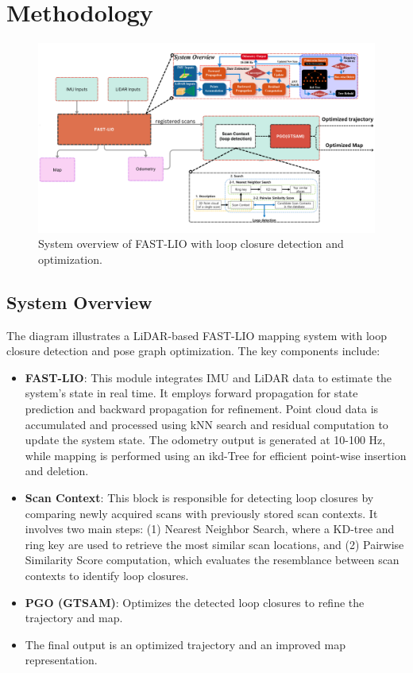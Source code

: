 \chapter{Methodology}
\label{ch:methodology}
\begin{figure}[h]
	\centering
	\includegraphics[width=\textwidth]{images/block-diagram.png}
	\caption{System overview of FAST-LIO with loop closure detection and optimization.}
	\label{fig:fast_lio}
\end{figure}

\section{System Overview}
The diagram illustrates a LiDAR-based FAST-LIO mapping system with loop closure detection and pose graph optimization. The key components include:

\begin{itemize}
	\item \textbf{FAST-LIO}: This module integrates IMU and LiDAR data to estimate the system's state in real time. It employs forward propagation for state prediction and backward propagation for refinement. Point cloud data is accumulated and processed using kNN search and residual computation to update the system state. The odometry output is generated at 10-100 Hz, while mapping is performed using an ikd-Tree for efficient point-wise insertion and deletion.
	\item \textbf{Scan Context}: This block is responsible for detecting loop closures by comparing newly acquired scans with previously stored scan contexts. It involves two main steps: (1) Nearest Neighbor Search, where a KD-tree and ring key are used to retrieve the most similar scan locations, and (2) Pairwise Similarity Score computation, which evaluates the resemblance between scan contexts to identify loop closures.
	\item \textbf{PGO (GTSAM)}: Optimizes the detected loop closures to refine the trajectory and map.
	\item The final output is an optimized trajectory and an improved map representation.
\end{itemize}





